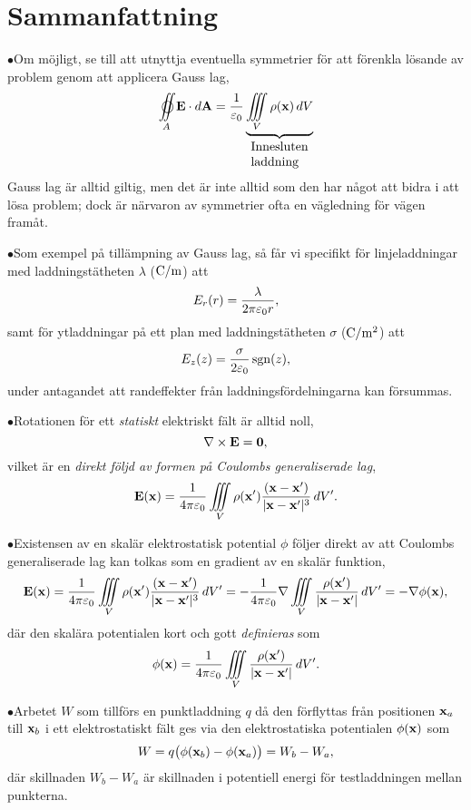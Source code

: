 \section{Sammanfattning}
\item{$\bullet$}{Om m{\"o}jligt, se till att utnyttja eventuella symmetrier f{\"o}r att f{\"o}renkla l{\"o}sande av problem genom att applicera Gauss lag,
$$
  \oiint_A {\bf E}\cdot d{\bf A}
     ={{1}\over{\varepsilon_0}}
       \underbrace{
         \iiint_V\rho({\bf x})\,dV
       }_{\vbox{\hbox{Innesluten}\hbox{laddning}}}
$$
Gauss lag {\"a}r alltid giltig, men det {\"a}r inte alltid som den har n{\aa}got att bidra i att l{\"o}sa problem; dock {\"a}r n{\"a}rvaron av symmetrier ofta en v{\"a}gledning f{\"o}r v{\"a}gen fram{\aa}t.}
\item{$\bullet$}{Som exempel p{\aa} till{\"a}mpning av Gauss lag, s{\aa} f{\aa}r vi specifikt f{\"o}r linjeladdningar med laddnings\-t{\"a}t\-heten $\lambda$ (${\rm C}/{\rm m}$) att
$$
  E_r(r)={{\lambda}\over{2\pi\varepsilon_0 r}},
$$
samt f{\"o}r ytladdningar p{\aa} ett plan med laddningst{\"a}theten $\sigma$ (${\rm C}/{\rm m}^2$) att
$$
  E_z(z)={{\sigma}\over{2\varepsilon_0}}\sgn(z),
$$
under antagandet att randeffekter fr{\aa}n laddningsf{\"o}rdelningarna kan f{\"o}rsummas.}
\item{$\bullet$}{Rotationen f{\"o}r ett {\it statiskt} elektriskt f{\"a}lt {\"a}r alltid noll,
$$
  \nabla\times{\bf E}={\bf 0},
$$
vilket {\"a}r en {\it direkt f{\"o}ljd av formen p{\aa} Coulombs generaliserade lag},
$$
  {\bf E}({\bf x})
    ={{1}\over{4\pi\varepsilon_0}}\iiint_V\rho({\bf x}')
      {{({\bf x}-{\bf x}')}\over{|{\bf x}-{\bf x}'|^3}}\,dV'.
$$
}
\item{$\bullet$}{Existensen av en skal{\"a}r elektrostatisk potential $\phi$ f{\"o}ljer direkt av att Coulombs generaliserade lag kan tolkas som en gradient av en skal{\"a}r funktion,
$$
  {\bf E}({\bf x})
    ={{1}\over{4\pi\varepsilon_0}}\iiint_V\rho({\bf x}')
      {{({\bf x}-{\bf x}')}\over{|{\bf x}-{\bf x}'|^3}}\,dV'
    =-{{1}\over{4\pi\varepsilon_0}}\nabla\iiint_V
      {{\rho({\bf x}')}\over{|{\bf x}-{\bf x}'|}}\,dV'
    =-\nabla\phi({\bf x}),
$$
d{\"a}r den skal{\"a}ra potentialen kort och gott {\it definieras} som
$$
  \phi({\bf x})={{1}\over{4\pi\varepsilon_0}}\iiint_V
      {{\rho({\bf x}')}\over{|{\bf x}-{\bf x}'|}}\,dV'.
$$}
\item{$\bullet$}{Arbetet $W$ som tillf{\"o}rs en punktladdning $q$ d{\aa} den f{\"o}rflyttas fr{\aa}n positionen ${\bf x}_a$ till ${\bf x}_b$ i ett elektrostatiskt f{\"a}lt ges via den elektrostatiska potentialen $\phi({\bf x})$ som
$$
  W=q\big(\phi({{\bf x}_b})-\phi({{\bf x}_a})\big)=W_b-W_a,
$$
d{\"a}r skillnaden $W_b-W_a$ {\"a}r skillnaden i potentiell energi f{\"o}r testladdningen mellan punkterna.}
\bye
